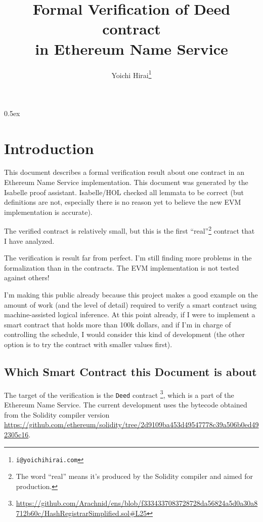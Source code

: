 \documentclass[11pt,a4paper]{article}
\begin{document}
\title{Formal Verification of Deed contract\\in Ethereum Name Service}
\author{Yoichi Hirai\footnote{\texttt{i@yoichihirai.com}}}
\maketitle

\tableofcontents

\parindent 0pt\parskip 0.5ex

\section{Introduction}

This document describes a formal verification result about one contract in
an Ethereum Name Service implementation.
This document was generated by the Isabelle proof assistant.
Isabelle/HOL checked all lemmata to be correct (but definitions are not,
especially there is no reason yet to believe the new EVM implementation is accurate).

The verified contract is relatively small,
but this is the first ``real''\footnote{The word ``real'' means it's
produced by the Solidity compiler and aimed for production.}
contract that I have analyzed.

The verification is result far from perfect.
I'm still finding more problems in the
formalization than in the contracts.  The EVM implementation is not tested against
others!

I'm making this public already because this project makes a
good example on the amount of work (and the level of detail) required to
verify a smart contract using machine-assisted logical inference.  At this
point already, if I were to
implement a smart contract that holds more than 100k dollars, and if
I'm in charge of controlling the schedule, I would consider this kind of
development (the other option is to try the contract with smaller values first).

\subsection{Which Smart Contract this Document is about}

The target of the verification is the \texttt{Deed} contract%
\footnote{\url{https://github.com/Arachnid/ens/blob/f3334337083728728da56824a5d0a30a8712b60c/HashRegistrarSimplified.sol\#L25}},
which is a part of the Ethereum Name Service.
The current development uses the bytecode obtained from the
Solidity compiler version \url{https://github.com/ethereum/solidity/tree/2d9109ba453d49547778c39a506b0ed492305c16}.
\end{document}
